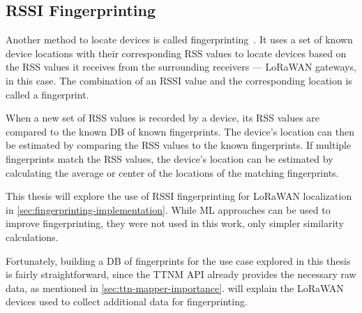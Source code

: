 \subsection{\acs{RSSI} Fingerprinting}\label{sec:rssi-fingerprinting}

Another method to locate devices is called fingerprinting~\cite{xia_indoor_2017}.
It uses a set of known device locations with their corresponding \ac{RSS} values to locate devices based on the \ac{RSS} values it receives from the surrounding receivers --- \ac{LoRaWAN} gateways, in this case.
The combination of an \ac{RSSI} value and the corresponding location is called a fingerprint.

When a new set of \ac{RSS} values is recorded by a device, its \ac{RSS} values are compared to the known \ac{DB} of known fingerprints.
The device's location can then be estimated by comparing the \ac{RSS} values to the known fingerprints.
If multiple fingerprints match the \ac{RSS} values, the device's location can be estimated by calculating the average or center of the locations of the matching fingerprints.

This thesis will explore the use of \ac{RSSI} fingerprinting for \ac{LoRaWAN} localization in \cref{sec:fingerprinting-implementation}.
While \ac{ML} approaches can be used to improve fingerprinting, they were not used in this work, only simpler similarity calculations.

Fortunately, building a \ac{DB} of fingerprints for the use case explored in this thesis is fairly straightforward, since the \ac{TTNM} \ac{API} already provides the necessary raw data, as mentioned in \cref{sec:ttn-mapper-importance}.
 will explain the \ac{LoRaWAN} devices used to collect additional data for fingerprinting.